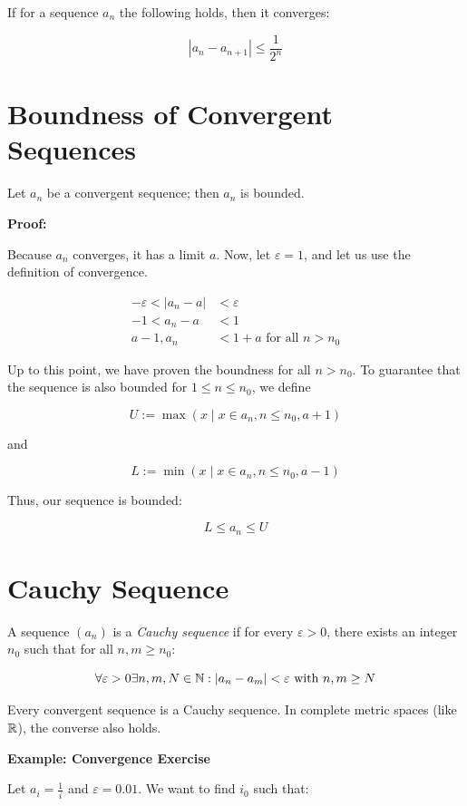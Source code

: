 If for a sequence \(a_n\) the following holds, then it converges:

\[
	| a_n  - a_{n + 1} | \le \frac{1}{2^n}
\]

\section{Boundness of Convergent Sequences}

Let \(a_n\) be a convergent sequence; then \(a_n\) is bounded.

\textbf{Proof:}

Because \(a_n\) converges, it has a limit \(a\). Now, let \(\varepsilon = 1\), and let us use the definition of convergence.

\begin{align*}
	-\varepsilon <|a_n - a| & < \varepsilon                    \\
	-1 < a_n - a            & < 1                              \\
	a - 1 , a_n             & < 1 + a \text{ for all } n > n_0
\end{align*}

Up to this point, we have proven the boundness for all \(n > n_0\). To guarantee that the sequence is also bounded
for \( 1 \le n \le n_0 \), we define

\[
	U := \max({x \mid x \in a_n , n \le n_0}, a + 1)
\]

and

\[
	L := \min({x \mid x \in a_n, n \le n_0}, a - 1)
\]

Thus, our sequence is bounded:

\[
	L \le a_n \le U
\]

\QED

\section{Cauchy Sequence}

A sequence \((a_n)\) is a \emph{Cauchy sequence} if for every \(\varepsilon > 0\), there exists an
integer \(n_0\) such that for all \(n, m \ge n_0\):

\[
	\forall \varepsilon > 0 \exists n,m,N \in \mathbb{N}: |a_n - a_m| < \varepsilon\ \text{with } n, m \ge N
\]

Every convergent sequence is a Cauchy sequence. In complete metric spaces (like \(\mathbb{R}\)), the
converse also holds.

\textbf{Example: Convergence Exercise}

Let \(a_i = \frac{1}{i}\) and \(\varepsilon = 0.01\). We want to find \(i_0\) such that:


